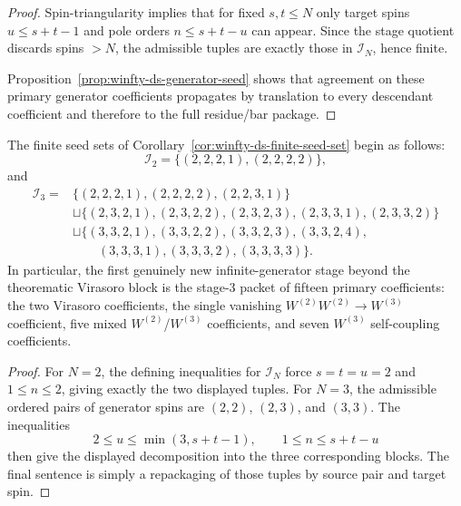 \begin{proof}
Spin-triangularity implies that for fixed $s,t \le N$ only target spins
$u \le s+t-1$ and pole orders $n \le s+t-u$ can appear.  Since the
stage quotient discards spins $>N$, the admissible tuples are exactly
those in $\mathcal{I}_N$, hence finite.

Proposition~\ref{prop:winfty-ds-generator-seed} shows that agreement on
these primary generator coefficients propagates by translation to every
descendant coefficient and therefore to the full residue/bar package.
\end{proof}

\begin{corollary}
\label{cor:winfty-ds-lowstage-seeds}
The finite seed sets of
Corollary~\ref{cor:winfty-ds-finite-seed-set} begin as follows:
\[
\mathcal{I}_2
=\{(2,2,2,1),(2,2,2,2)\},
\]
and
\begin{align*}
\mathcal{I}_3
= {} & \{(2,2,2,1),(2,2,2,2),(2,2,3,1)\} \\
& \sqcup\{(2,3,2,1),(2,3,2,2),(2,3,2,3),(2,3,3,1),(2,3,3,2)\} \\
& \sqcup\{(3,3,2,1),(3,3,2,2),(3,3,2,3),(3,3,2,4), \\
& \qquad (3,3,3,1),(3,3,3,2),(3,3,3,3)\}.
\end{align*}
In particular, the first genuinely new infinite-generator stage beyond
the theorematic Virasoro block is the stage-$3$ packet of fifteen
primary coefficients: the two Virasoro coefficients, the single
vanishing $W^{(2)}W^{(2)}\to W^{(3)}$ coefficient, five mixed
$W^{(2)}$/$W^{(3)}$ coefficients, and seven $W^{(3)}$ self-coupling
coefficients.
\end{corollary}

\begin{proof}
For $N=2$, the defining inequalities for $\mathcal{I}_N$ force
$s=t=u=2$ and $1\le n\le 2$, giving exactly the two displayed tuples.
For $N=3$, the admissible ordered pairs of generator spins are
$(2,2)$, $(2,3)$, and $(3,3)$.  The inequalities
\[
2\le u\le \min(3,s+t-1),
\qquad
1\le n\le s+t-u
\]
then give the displayed decomposition into the three corresponding
blocks.  The final sentence is simply a repackaging of those tuples by
source pair and target spin.
\end{proof}

